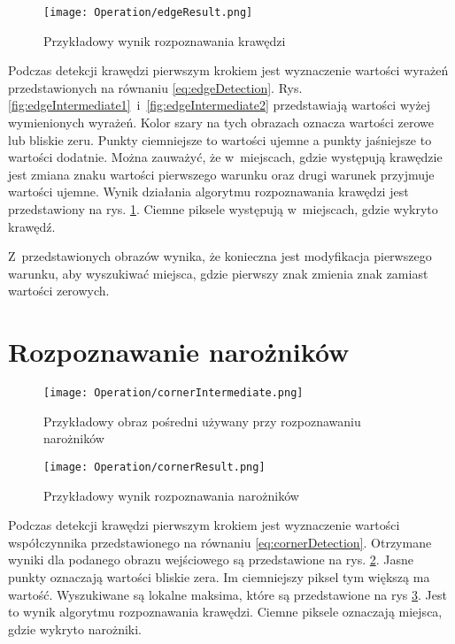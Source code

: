 \begin{figure}[h]
\begin{center}
\texttt{[image: Operation/edgeResult.png]}
\end{center}
\caption{Przykładowy wynik rozpoznawania krawędzi}
\label{fig:edgeResult}
\end{figure}

Podczas detekcji krawędzi pierwszym krokiem jest wyznaczenie wartości wyrażeń przedstawionych na równaniu \eqref{eq:edgeDetection}. Rys. \ref{fig:edgeIntermediate1}~i~\ref{fig:edgeIntermediate2} przedstawiają wartości wyżej wymienionych wyrażeń. Kolor szary na tych obrazach oznacza wartości zerowe lub bliskie zeru. Punkty ciemniejsze to wartości ujemne a punkty jaśniejsze to wartości dodatnie. Można zauważyć, że w~miejscach, gdzie występują krawędzie jest zmiana znaku wartości pierwszego warunku oraz drugi warunek przyjmuje wartości ujemne. Wynik działania algorytmu rozpoznawania krawędzi jest przedstawiony na rys. \ref{fig:edgeResult}. Ciemne piksele występują w~miejscach, gdzie wykryto krawędź.

Z~przedstawionych obrazów wynika, że konieczna jest modyfikacja pierwszego warunku, aby wyszukiwać miejsca, gdzie pierwszy znak zmienia znak zamiast wartości zerowych.

\section{Rozpoznawanie narożników}
\label{sec:dzialanieCorner}

\begin{figure}[h]
\begin{center}
\texttt{[image: Operation/cornerIntermediate.png]}
\end{center}
\caption{Przykładowy obraz pośredni używany przy rozpoznawaniu narożników}
\label{fig:cornerIntermediate}
\end{figure}

\begin{figure}[h]
\begin{center}
\texttt{[image: Operation/cornerResult.png]}
\end{center}
\caption{Przykładowy wynik rozpoznawania narożników}
\label{fig:cornerResult}
\end{figure}

Podczas detekcji krawędzi pierwszym krokiem jest wyznaczenie wartości współczynnika przedstawionego na równaniu \eqref{eq:cornerDetection}. Otrzymane wyniki dla podanego obrazu wejściowego są przedstawione na rys. \ref{fig:cornerIntermediate}. Jasne punkty oznaczają wartości bliskie zera. Im ciemniejszy piksel tym większą ma wartość. Wyszukiwane są lokalne maksima, które są przedstawione na rys \ref{fig:cornerResult}. Jest to wynik algorytmu rozpoznawania krawędzi. Ciemne piksele oznaczają miejsca, gdzie wykryto narożniki.

